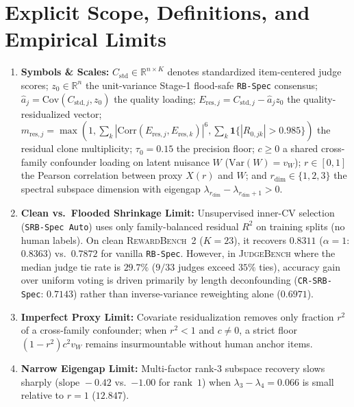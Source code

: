 \documentclass[11pt]{article}
\newcommand{\R}{\mathbb{R}}
\newcommand{\Var}{\mathrm{Var}}
\newcommand{\Cov}{\mathrm{Cov}}
\begin{document}
\section{Explicit Scope, Definitions, and Empirical Limits}
\begin{enumerate}[leftmargin=*,itemsep=2pt]
\item \textbf{Symbols \& Scales:} $C_{\mathrm{std}} \in \R^{n\times K}$ denotes standardized item-centered judge scores; $z_0 \in \R^n$ the unit-variance Stage-1 flood-safe \texttt{RB-Spec} consensus; $\hat{a}_j = \Cov(C_{\mathrm{std},j}, z_0)$ the quality loading; $E_{\mathrm{res},j} = C_{\mathrm{std},j} - \hat{a}_j z_0$ the quality-residualized vector; $m_{\mathrm{res},j} = \max(1, \sum_k |\mathrm{Corr}(E_{\mathrm{res},j},E_{\mathrm{res},k})|^6, \sum_k \mathbf{1}\{|R_{0,jk}| > 0.985\})$ the residual clone multiplicity; $\tau_0 = 0.15$ the precision floor; $c \ge 0$ a shared cross-family confounder loading on latent nuisance $W$ ($\Var(W)=v_W$); $r \in [0,1]$ the Pearson correlation between proxy $X(r)$ and $W$; and $r_{\mathrm{dim}} \in \{1,2,3\}$ the spectral subspace dimension with eigengap $\lambda_{r_{\mathrm{dim}}} - \lambda_{r_{\mathrm{dim}}+1} > 0$.
\item \textbf{Clean vs.\ Flooded Shrinkage Limit:} Unsupervised inner-CV selection (\texttt{SRB-Spec Auto}) uses only family-balanced residual $R^2$ on training splits (no human labels). On clean \textsc{RewardBench~2} ($K=23$), it recovers $\mathbf{0.8311}$ ($\alpha=1$: $\mathbf{0.8363}$) vs.\ $0.7872$ for vanilla \texttt{RB-Spec}. However, in \textsc{JudgeBench} where the median judge tie rate is $29.7\%$ ($9/33$ judges exceed $35\%$ ties), accuracy gain over uniform voting is driven primarily by length deconfounding (\texttt{CR-SRB-Spec}: $\mathbf{0.7143}$) rather than inverse-variance reweighting alone ($0.6971$).
\item \textbf{Imperfect Proxy Limit:} Covariate residualization removes only fraction $r^2$ of a cross-family confounder; when $r^2 < 1$ and $c \neq 0$, a strict floor $(1-r^2)c^2 v_W$ remains insurmountable without human anchor items.
\item \textbf{Narrow Eigengap Limit:} Multi-factor rank-$3$ subspace recovery slows sharply ($\text{slope } -0.42$ vs.\ $-1.00$ for rank~$1$) when $\lambda_3 - \lambda_4 = 0.066$ is small relative to $r=1$ ($12.847$).
\end{enumerate}
\end{document}
